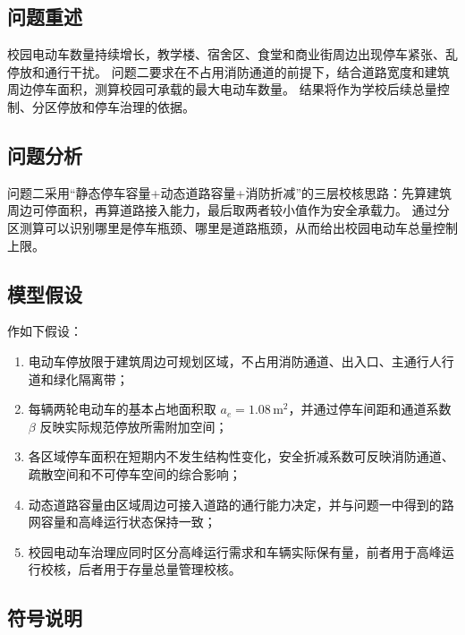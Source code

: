 \documentclass[UTF8,zihao=-4,a4paper]{ctexart}
\numberwithin{table}{section}
\numberwithin{figure}{section}
\numberwithin{equation}{section}
\begin{document}
\subsection{问题重述}

校园电动车数量持续增长，教学楼、宿舍区、食堂和商业街周边出现停车紧张、乱停放和通行干扰。
问题二要求在不占用消防通道的前提下，结合道路宽度和建筑周边停车面积，测算校园可承载的最大电动车数量。
结果将作为学校后续总量控制、分区停放和停车治理的依据。

\subsection{问题分析}

问题二采用“静态停车容量+动态道路容量+消防折减”的三层校核思路：先算建筑周边可停面积，再算道路接入能力，最后取两者较小值作为安全承载力。
通过分区测算可以识别哪里是停车瓶颈、哪里是道路瓶颈，从而给出校园电动车总量控制上限。

\subsection{模型假设}

作如下假设：
\begin{enumerate}
    \item 电动车停放限于建筑周边可规划区域，不占用消防通道、出入口、主通行人行道和绿化隔离带；
    \item 每辆两轮电动车的基本占地面积取 $a_e=1.08\,\text{m}^2$，并通过停车间距和通道系数 $\beta$ 反映实际规范停放所需附加空间；
    \item 各区域停车面积在短期内不发生结构性变化，安全折减系数可反映消防通道、疏散空间和不可停车空间的综合影响；
    \item 动态道路容量由区域周边可接入道路的通行能力决定，并与问题一中得到的路网容量和高峰运行状态保持一致；
    \item 校园电动车治理应同时区分高峰运行需求和车辆实际保有量，前者用于高峰运行校核，后者用于存量总量管理校核。
\end{enumerate}

\subsection{符号说明}
\end{document}
